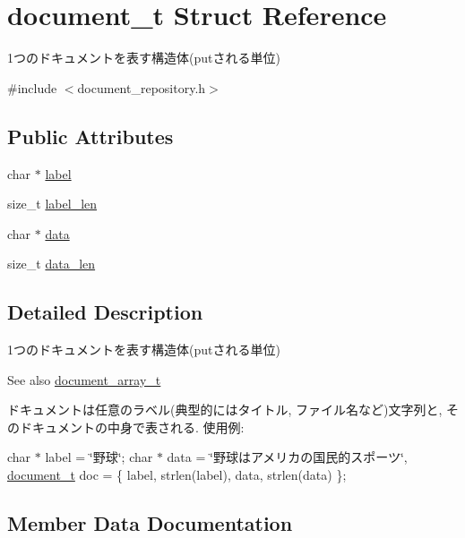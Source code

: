 \hypertarget{structdocument__t}{}\section{document\+\_\+t Struct Reference}
\label{structdocument__t}


1つのドキュメントを表す構造体(putされる単位)  




{\ttfamily \#include $<$document\+\_\+repository.\+h$>$}

\subsection*{Public Attributes}
\begin{DoxyCompactItemize}
\item 
char $\ast$ \hyperlink{structdocument__t_adc78927f2a7a1579e3fd1c965abba435}{label}
\item 
size\+\_\+t \hyperlink{structdocument__t_aa941cb26dde0de815f368e4503a689a3}{label\+\_\+len}
\item 
char $\ast$ \hyperlink{structdocument__t_a35382946989679b4166825f1b4e2d92b}{data}
\item 
size\+\_\+t \hyperlink{structdocument__t_a39aff76b482302a6872c04a1d0fba28f}{data\+\_\+len}
\end{DoxyCompactItemize}


\subsection{Detailed Description}
1つのドキュメントを表す構造体(putされる単位) 

\begin{DoxySeeAlso}{See also}
\hyperlink{structdocument__array__t}{document\+\_\+array\+\_\+t}
\end{DoxySeeAlso}
ドキュメントは任意のラベル(典型的にはタイトル, ファイル名など)文字列と, そのドキュメントの中身で表される. 使用例\+:

char $\ast$ label = \char`\"{}野球\char`\"{}; char $\ast$ data = \char`\"{}野球はアメリカの国民的スポーツ\char`\"{}, \hyperlink{structdocument__t}{document\+\_\+t} doc = \{ label, strlen(label), data, strlen(data) \}; 

\subsection{Member Data Documentation}
\mbox{\label{structdocument__t_a35382946989679b4166825f1b4e2d92b}} 
